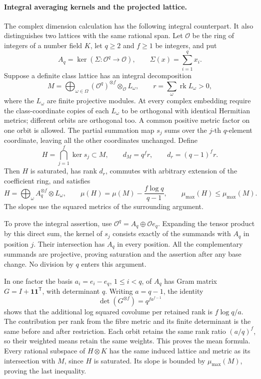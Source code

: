\paragraph{Integral averaging kernels and the projected lattice.}
%
The complex dimension calculation has the following integral
counterpart. It also distinguishes two lattices with the same
rational span. Let \(\mathcal O\) be the ring of integers of a number
field \(K\), let \(q\ge2\) and \(f\ge1\) be integers, and put
\[
 A_q=\ker(\Sigma:\mathcal O^q\longrightarrow\mathcal O),
 \qquad \Sigma(x)=\sum_{i=1}^q x_i.
\]
Suppose a definite class lattice has an integral decomposition
\[
 M=\bigoplus_{\omega\in\Omega}
       (\mathcal O^q)^{\otimes f}\otimes_{\mathcal O} L_\omega,
 \qquad r=\sum_\omega\operatorname{rk}L_\omega>0,
\]
where the \(L_\omega\) are finite projective modules. At every
complex embedding require the class-coordinate copies of each
\(L_\omega\) to be orthogonal with identical Hermitian metrics;
different orbits are orthogonal too. A common positive metric
factor on one orbit is allowed. The partial summation map \(s_j\)
sums over the \(j\)-th \(q\)-element coordinate, leaving all the
other coordinates unchanged. Define
\[
 H=\bigcap_{j=1}^f\ker s_j\subset M,
 \qquad d_M=q^f r,\qquad d_r=(q-1)^f r.
\]
Then \(H\) is saturated, has rank \(d_r\), commutes with arbitrary
extension of the coefficient ring, and satisfies
\begin{equation}
\label{eq:integral-ramified-kernel}
 H=\bigoplus_\omega A_q^{\otimes f}\otimes L_\omega,
 \qquad
 \mu(H)=\mu(M)-\frac{f\log q}{q-1},\qquad
 \mu_{\max}(H)\le\mu_{\max}(M).
\end{equation}
The slopes use the squared metrics of the surrounding argument.

To prove the integral assertion, use
\(\mathcal O^q=A_q\oplus\mathcal O e_q\). Expanding the tensor
product by this direct sum, the kernel of \(s_j\) consists exactly
of the summands with \(A_q\) in position \(j\). Their intersection
has \(A_q\) in every position. All the complementary summands are
projective, proving saturation and the assertion after any base
change. No division by \(q\) enters this argument.

In one factor the basis \(a_i=e_i-e_q\), \(1\le i<q\), of
\(A_q\) has Gram matrix
\(G=I+\mathbf1\mathbf1^{\mathsf T}\), with determinant \(q\).
Writing \(a=q-1\), the identity
\[
 \det(G^{\otimes f})=q^{f a^{f-1}}
\]
shows that the additional log squared covolume per retained rank
is \(f\log q/a\). The contribution per rank from the fibre
metric and its finite determinant is the same before and after
restriction. Each orbit retains the same rank ratio \((a/q)^f\),
so their weighted means retain the same weights. This proves
the mean formula. Every rational subspace of \(H\otimes K\)
has the same induced lattice and metric as its intersection with
\(M\), since \(H\) is saturated. Its slope is bounded by
\(\mu_{\max}(M)\), proving the last inequality.

